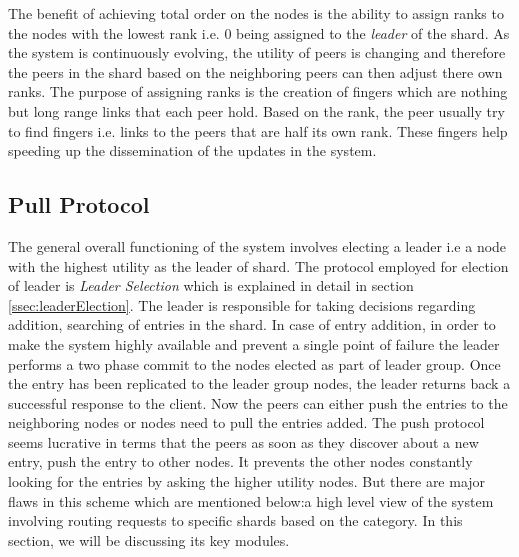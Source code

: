 \documentclass[12pt,a4paper,twoside,openright]{book}
\begin{document}
\par The benefit of achieving total order on the nodes is the ability to assign ranks to the nodes with the lowest rank i.e. 0 being assigned to the \textit{leader} of the shard. As the system is continuously evolving, the utility of peers is changing and therefore the peers in the shard based on the neighboring peers can then adjust there own ranks. The purpose of assigning ranks is the creation of fingers which are nothing but long range links that each peer hold. Based on the rank, the peer usually try to find fingers i.e. links to the peers that are half its own rank. These fingers help speeding up the dissemination of the updates in the system.


\subsection{Pull Protocol}

The general overall functioning of the system involves electing a leader i.e a node with the highest utility as the leader of shard. The protocol employed for election of leader is \textit{Leader Selection} which is explained in detail in section \ref{ssec:leaderElection}. The leader is responsible for taking decisions regarding addition, searching of entries in the shard. In case of entry addition, in order to make the system highly available and prevent a single point of failure the leader performs a two phase commit to the nodes elected as part of leader group. Once the entry has been replicated to the leader group nodes, the leader returns back a successful response to the client. Now the peers can either push the entries to the neighboring nodes or nodes need to pull the entries added. The push protocol seems lucrative in terms that the peers as soon as they discover about a new entry, push the entry to other nodes. It prevents the other nodes constantly looking for the entries by asking the higher utility nodes. But there are major flaws in this scheme which are mentioned below:a high level view of the system involving routing requests to specific shards based on the category. In this section, we will be discussing its key modules.
\end{document}
